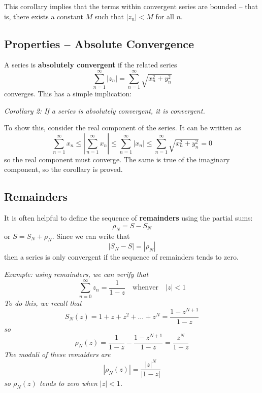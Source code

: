 \documentclass{article}
\renewcommand{\emph}{\textbf}
\begin{document}
This corollary implies that the terms within convergent series are bounded -- that is, there exists a constant $M$ such that $|z_n| < M$ for all $n$.

\subsection{Properties -- Absolute Convergence}
A series is \emph{absolutely convergent} if the related series
\[
	\sum_{n=1}^\infty |z_n| = \sum_{n=1}^\infty \sqrt{x_n^2 + y_n^2}
\]
converges. This has a simple implication:

\textit{Corollary 2: If a series is absolutely convergent, it is convergent.}

To show this, consider the real component of the series. It can be written as
\[
	\sum_{n=1}^\infty x_n
	\le \left| \sum_{n=1}^\infty x_n \right|
	\le \sum_{n=1}^\infty |x_n|
	\le \sum_{n=1}^\infty \sqrt{x_n^2 + y_n^2}
	= 0
\]
so the real component must converge. The same is true of the imaginary component, so the corollary is proved.

\subsection{Remainders}
It is often helpful to define the sequence of \emph{remainders} using the partial sums:
\[
	\rho_N = S - S_N
\]
or $S = S_N + \rho_N$. Since we can write that
\[
	|S_N - S| = |\rho_N|
\]
then a series is only convergent if the sequence of remainders tends to zero.

\textit{Example: using remainders, we can verify that
\[
	\sum_{n=0}^\infty z_n = \frac{1}{1 - z} \quad \text{whenver} \quad |z| < 1
\]
To do this, we recall that
\[
	S_N(z) = 1 + z + z^2 + \dots + z^N = \frac{1 - z^{N+1}}{1 - z}
\]
so
\[
	\rho_N(z) = \frac{1}{1 - z} - \frac{1 - z^{N+1}}{1 - z}
	= \frac{z^N}{1 - z}
\]
The moduli of these remaiders are
\[
	|\rho_N(z)| = \frac{|z|^N}{|1 - z|}
\]
so $\rho_N(z)$ tends to zero when $|z| < 1$.}
\end{document}
